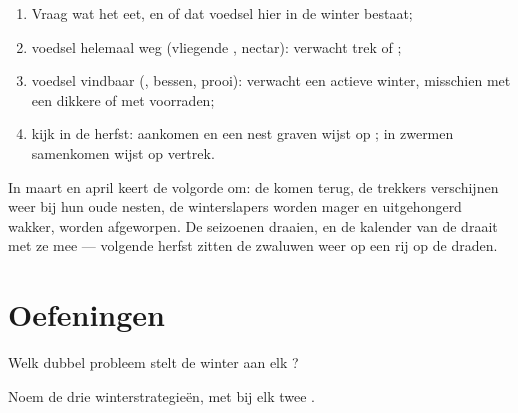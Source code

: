 \begin{method}\label{met:g3:animals-through-seasons:guess}
\begin{enumerate}
  \item Vraag wat het eet, en of dat voedsel hier in de winter bestaat;
  \item voedsel helemaal weg (vliegende , nectar): verwacht
        trek of ;
  \item voedsel vindbaar (, bessen, prooi): verwacht een actieve
        winter, misschien met een dikkere  of met voorraden;
  \item kijk in de herfst: aankomen en een nest graven wijst op
        ; in zwermen samenkomen wijst op vertrek.
\end{enumerate}
\end{method}

\begin{example}\label{ex:g3:animals-through-seasons:spring}
In maart en april keert de volgorde om: de  komen terug, de
trekkers verschijnen weer bij hun oude nesten, de winterslapers worden
mager en uitgehongerd wakker,  worden afgeworpen. De
seizoenen draaien, en de kalender van de  draait met ze mee ---
volgende herfst zitten de zwaluwen weer op een rij op de draden.
\end{example}

\section{Oefeningen}

\begin{exercise}[$\star$]\label{exo:g3:animals-through-seasons:1}
Welk dubbel probleem stelt de winter aan elk ?
\end{exercise}

\begin{exercise}[$\star$]\label{exo:g3:animals-through-seasons:2}
Noem de drie winterstrategieën, met bij elk twee .
\end{exercise}

